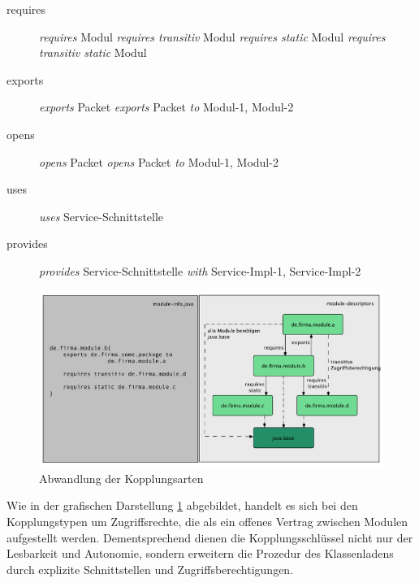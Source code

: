     \begin{description}
      \item[requires]\hfill
      \newline \textit{requires} Modul
      \newline \textit{requires transitiv} Modul
      \newline \textit{requires static} Modul
      \newline \textit{requires transitiv static} Modul
      \item[exports]\hfill
      \newline \textit{exports} Packet
      \newline \textit{exports} Packet \textit{to} Modul-1, Modul-2
      \item[opens]\hfill
      \newline \textit{opens} Packet
      \newline \textit{opens} Packet \textit{to} Modul-1, Modul-2
      \item [uses]\hfill
      \newline \textit{uses} Service-Schnittstelle 
      \item[provides]\hfill
        \newline \textit{provides} Service-Schnittstelle \textit{with} Service-Impl-1, Service-Impl-2
  \end{description}

  \begin{figure}[h!]
      \centering
      \includegraphics[width=\textwidth]{material/images/transitiv.pdf}
      \caption{Abwandlung der Kopplungsarten}
      \label{fig:abw-kopl}
  \end{figure}

  Wie in der grafischen Darstellung \ref{fig:abw-kopl} abgebildet, handelt es sich bei den Kopplungstypen um Zugriffsrechte, die als ein offenes Vertrag zwischen Modulen aufgestellt werden. Dementsprechend dienen die Kopplungsschlüssel nicht nur der Lesbarkeit und Autonomie, sondern erweitern die Prozedur des Klassenladens durch explizite Schnittstellen und Zugriffsberechtigungen.\cite{modulMitJava9}

